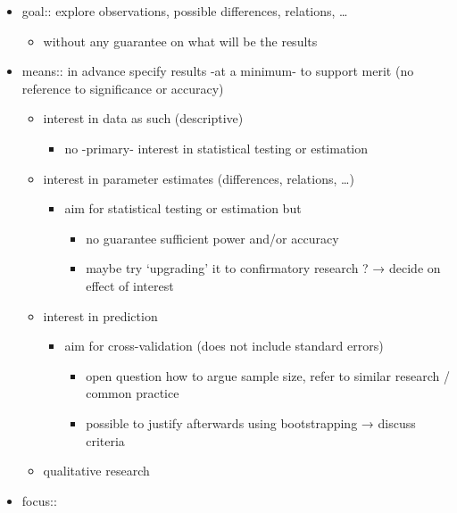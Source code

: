 \documentclass[
]{article}
\providecommand{\tightlist}{%
  \setlength{\itemsep}{0pt}\setlength{\parskip}{0pt}}
\begin{document}
\begin{itemize}
\tightlist
\item
  goal:: explore observations, possible differences, relations, \ldots{}

  \begin{itemize}
  \tightlist
  \item
    without any guarantee on what will be the results
  \end{itemize}
\item
  means:: in advance specify results -at a minimum- to support merit (no
  reference to significance or accuracy)

  \begin{itemize}
  \tightlist
  \item
    interest in data as such (descriptive)

    \begin{itemize}
    \tightlist
    \item
      no -primary- interest in statistical testing or estimation
    \end{itemize}
  \item
    interest in parameter estimates (differences, relations, \ldots)

    \begin{itemize}
    \tightlist
    \item
      aim for statistical testing or estimation but

      \begin{itemize}
      \tightlist
      \item
        no guarantee sufficient power and/or accuracy
      \item
        maybe try `upgrading' it to confirmatory research ? → decide on
        effect of interest
      \end{itemize}
    \end{itemize}
  \item
    interest in prediction

    \begin{itemize}
    \tightlist
    \item
      aim for cross-validation (does not include standard errors)

      \begin{itemize}
      \tightlist
      \item
        open question how to argue sample size, refer to similar
        research / common practice
      \item
        possible to justify afterwards using bootstrapping → discuss
        criteria
      \end{itemize}
    \end{itemize}
  \item
    qualitative research \\
  \end{itemize}
\item
  focus::


\end{itemize}
\end{document}

